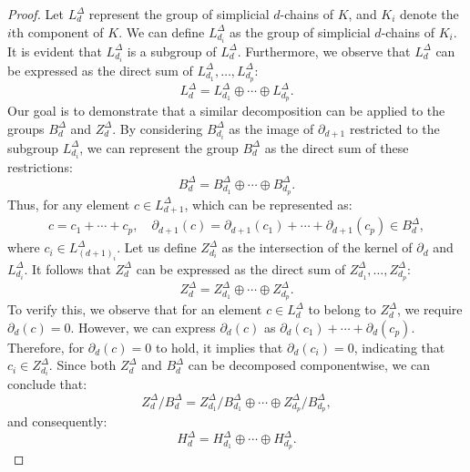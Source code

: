 \documentclass{amsart}
\begin{document}
\begin{proof}
Let $L^\Delta_d$ represent the group of simplicial $d$-chains of $K$, and $K_i$ denote the $i$th component of $K$. We can define $L^\Delta_{d_i}$ as the group of simplicial $d$-chains of $K_i$. It is evident that $L^\Delta_{d_i}$ is a subgroup of $L^\Delta_d$. Furthermore, we observe that $L^\Delta_d$ can be expressed as the direct sum of $L^\Delta_{d_1}, \ldots, L^\Delta_{d_p}$:
\begin{equation}
L^\Delta_d = L^\Delta_{d_1} \oplus \cdots \oplus L^\Delta_{d_p}.
\end{equation}
Our goal is to demonstrate that a similar decomposition can be applied to the groups $B^\Delta_d$ and $Z^\Delta_d$. By considering $B^\Delta_{d_i}$ as the image of $\partial_{d+1}$ restricted to the subgroup $L^\Delta_{d_i}$, we can represent the group $B^\Delta_d$ as the direct sum of these restrictions:
\begin{equation}
B^\Delta_d = B^\Delta_{d_1} \oplus \cdots \oplus B^\Delta_{d_p}.
\end{equation}
Thus, for any element $c \in L^\Delta_{d+1}$, which can be represented as:
\begin{align}
c = c_1 + \cdots + c_p, \quad \partial_{d+1}(c) = \partial_{d+1}(c_1) + \cdots + \partial_{d+1}(c_p) \in B^\Delta_d,
\end{align}
where $c_i \in L^\Delta_{{(d+1)}_i}$.
Let us define $Z^\Delta_{d_i}$ as the intersection of the kernel of $\partial_{d}$ and $L^\Delta_{d_i}$. It follows that $Z^\Delta_d$ can be expressed as the direct sum of $Z^\Delta_{d_1}, \ldots, Z^\Delta_{d_p}$:
\begin{equation}
Z^\Delta_d = Z^\Delta_{d_1} \oplus \cdots \oplus Z^\Delta_{d_p}.
\end{equation}
To verify this, we observe that for an element $c \in L^\Delta_d$ to belong to $Z^\Delta_d$, we require $\partial_{d}(c) = 0$. However, we can express $\partial_{d}(c)$ as $\partial_{d}(c_1) + \cdots + \partial_{d}(c_p)$. Therefore, for $\partial_{d}(c) = 0$ to hold, it implies that $\partial_{d}(c_i) = 0$, indicating that $c_i \in Z^\Delta_{d_i}$.
Since both $Z^\Delta_d$ and $B^\Delta_d$ can be decomposed componentwise, we can conclude that:
\begin{equation}
Z^\Delta_d / B^\Delta_d = Z^\Delta_{d_1} / B^\Delta_{d_1} \oplus \cdots \oplus Z^\Delta_{d_p} / B^\Delta_{d_p},
\end{equation}
and consequently:
\begin{equation}
H^\Delta_d = H^\Delta_{d_1} \oplus \cdots \oplus H^\Delta_{d_p}.
\end{equation}
\end{proof}
\end{document}
